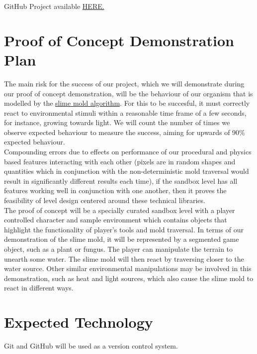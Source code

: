 \documentclass{article}
\begin{document}
GitHub Project available \href{https://github.com/users/felix-hurst/projects/2}{HERE.}

\section{Proof of Concept Demonstration Plan}

The main risk for the success of our project, which we will demonstrate during our proof of concept demonstration, will be the behaviour of our organism that is modelled by the \href{https://www.baeldung.com/cs/slime-mould-algorithm}{slime mold algorithm}. For this to be succesful, it must correctly react to environmental stimuli within a reasonable time frame of a few seconds, for instance, growing towards light. We will count the number of times we observe expected behaviour to measure the success, aiming for upwards of 90\% expected behaviour.\\

Compounding errors due to effects on performance of our procedural and physics based features interacting with each other (pixels are in random shapes and quantities which in conjunction with the non-deterministic mold traversal would result in significantly different results each time), if the sandbox level has all features working well in conjunction with one another, then it proves the feasibility of level design centered around these technical libraries.\\

The proof of concept will be a specially curated sandbox level with a player controlled character and sample environment which contains objects that highlight the functionality of player’s tools and mold traversal. In terms of our demonstration of the slime mold, it will be represented by a segmented game object, such as a plant or fungus. The player can manipulate the terrain to unearth some water. The slime mold will then react by traversing closer to the water source. Other similar environmental manipulations may be involved in this demonstration, such as heat and light sources, which also cause the slime mold to react in different ways.\\



\section{Expected Technology}

Git and GitHub will be used as a version control system.\\
\end{document}
